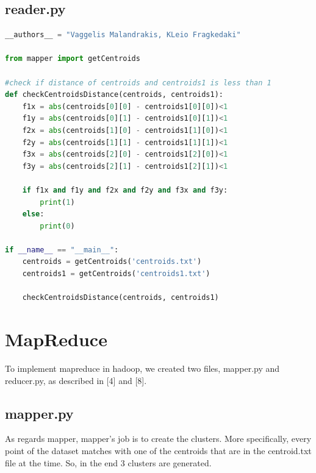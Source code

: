 \subsection{reader.py}
\begin{lstlisting}[language=Python]
__authors__ = "Vaggelis Malandrakis, KLeio Fragkedaki"

from mapper import getCentroids
	
#check if distance of centroids and centroids1 is less than 1
def checkCentroidsDistance(centroids, centroids1):
	f1x = abs(centroids[0][0] - centroids1[0][0])<1
	f1y = abs(centroids[0][1] - centroids1[0][1])<1
	f2x = abs(centroids[1][0] - centroids1[1][0])<1
	f2y = abs(centroids[1][1] - centroids1[1][1])<1
	f3x = abs(centroids[2][0] - centroids1[2][0])<1
	f3y = abs(centroids[2][1] - centroids1[2][1])<1

	if f1x and f1y and f2x and f2y and f3x and f3y:
		print(1)
	else:
		print(0)

if __name__ == "__main__":
	centroids = getCentroids('centroids.txt')
	centroids1 = getCentroids('centroids1.txt')
	
	checkCentroidsDistance(centroids, centroids1)

\end{lstlisting}

\section{MapReduce}
To implement mapreduce in hadoop, we created two files, mapper.py and reducer.py, as described in [4] and [8].

\subsection{mapper.py}
 As regards mapper, mapper's job is to create the clusters. More specifically, every point of the dataset matches with one of the centroids that are in the centroid.txt file at the time. So, in the end 3 clusters are generated.
 
 \HRule \\[0.2cm] %
 
